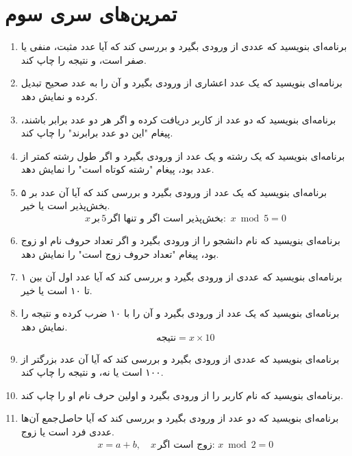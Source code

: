 \documentclass[a4paper,12pt]{article}
\begin{document}
	
	\newpage
	\section*{تمرین‌های سری سوم}
	\begin{enumerate}
		
		\item برنامه‌ای بنویسید که عددی از ورودی بگیرد و بررسی کند که آیا عدد مثبت، منفی یا صفر است، و نتیجه را چاپ کند.
		
		\item برنامه‌ای بنویسید که یک عدد اعشاری از ورودی بگیرد و آن را به عدد صحیح تبدیل کرده و نمایش دهد.
		
		\item برنامه‌ای بنویسید که دو عدد از کاربر دریافت کرده و اگر هر دو عدد برابر باشند، پیغام "این دو عدد برابرند" را چاپ کند.
		
		\item برنامه‌ای بنویسید که یک رشته و یک عدد از ورودی بگیرد و اگر طول رشته کمتر از عدد بود، پیغام "رشته کوتاه است" را نمایش دهد.
		
		\item برنامه‌ای بنویسید که یک عدد از ورودی بگیرد و بررسی کند که آیا آن عدد بر ۵ بخش‌پذیر است یا خیر.
		\[
		x \, \text{بر} \, 5 \, \text{بخش‌پذیر است اگر و تنها اگر: } \, x \bmod 5 = 0
		\]
		
		\item برنامه‌ای بنویسید که نام دانشجو را از ورودی بگیرد و اگر تعداد حروف نام او زوج بود، پیغام "تعداد حروف زوج است" را نمایش دهد.
		
		\item برنامه‌ای بنویسید که عددی از ورودی بگیرد و بررسی کند که آیا عدد اول آن بین ۱ تا ۱۰ است یا خیر.
		
		\item برنامه‌ای بنویسید که یک عدد از ورودی بگیرد و آن را با ۱۰ ضرب کرده و نتیجه را نمایش دهد.
		\[
		\text{نتیجه} = x \times 10
		\]
		
		\item برنامه‌ای بنویسید که عددی از ورودی بگیرد و بررسی کند که آیا آن عدد بزرگتر از ۱۰۰ است یا نه، و نتیجه را چاپ کند.
		
		\item برنامه‌ای بنویسید که نام کاربر را از ورودی بگیرد و اولین حرف نام او را چاپ کند.
		
		\item برنامه‌ای بنویسید که دو عدد از ورودی بگیرد و بررسی کند که آیا حاصل‌جمع آن‌ها عددی فرد است یا زوج.
		\[
		x = a + b, \quad x \, \text{زوج است اگر: } x \bmod 2 = 0
		\]
		

\end{enumerate}
\end{document}
